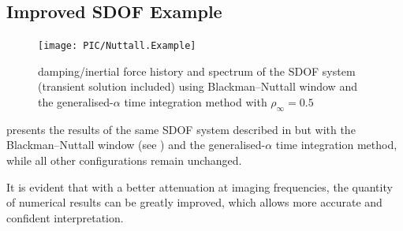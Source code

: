 \subsection{Improved SDOF Example}
\begin{figure}[htb!]
\centering
\texttt{[image: PIC/Nuttall.Example]}
\caption{damping/inertial force history and spectrum of the SDOF system (transient solution included) using Blackman--Nuttall window and the generalised-$\alpha$ time integration method with $\rho_\infty=0.5$}\label{fig:nuttall_example}
\end{figure}
 presents the results of the same SDOF system described in  but with the Blackman--Nuttall window (see ) and the generalised-$\alpha$ time integration method, while all other configurations remain unchanged.

It is evident that with a better attenuation at imaging frequencies, the quantity of numerical results can be greatly improved, which allows more accurate and confident interpretation.
